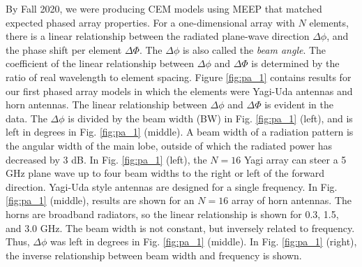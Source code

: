 \documentclass[../../main.tex]{subfiles}
\begin{document}
By Fall 2020, we were producing CEM models using MEEP that matched expected phased array properties.  For a one-dimensional array with $N$ elements, there is a linear relationship between the radiated plane-wave direction $\Delta \phi$, and the phase shift per element $\Delta \Phi$.  The $\Delta \phi$ is also called the \textit{beam angle}.  The coefficient of the linear relationship between $\Delta \phi$ and $\Delta \Phi$ is determined by the ratio of real wavelength to element spacing.  Figure \ref{fig:pa_1} contains results for our first phased array models in which the elements were Yagi-Uda antennas and horn antennas.  The linear relationship between $\Delta \phi$ and $\Delta \Phi$ is evident in the data.  The $\Delta \phi$ is divided by the beam width (BW) in Fig. \ref{fig:pa_1} (left), and is left in degrees in Fig. \ref{fig:pa_1} (middle).  A beam width of a radiation pattern is the angular width of the main lobe, outside of which the radiated power has decreased by 3 dB.  In Fig. \ref{fig:pa_1} (left), the $N=16$ Yagi array can steer a 5 GHz plane wave up to four beam widths to the right or left of the forward direction.  Yagi-Uda style antennas are designed for a single frequency.  In Fig. \ref{fig:pa_1} (middle), results are shown for an $N=16$ array of horn antennas.  The horns are broadband radiators, so the linear relationship is shown for 0.3, 1.5, and 3.0 GHz.  The beam width is not constant, but inversely related to frequency.  Thus, $\Delta \phi$ was left in degrees in Fig. \ref{fig:pa_1} (middle).  In Fig. \ref{fig:pa_1} (right), the inverse relationship between beam width and frequency is shown. \\ \vspace{2.5mm}
\end{document}
